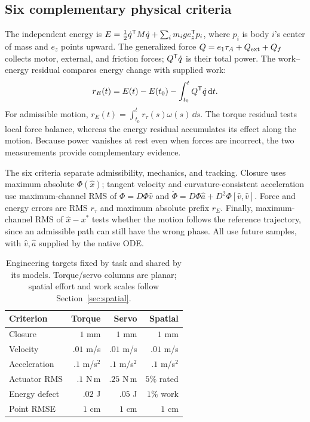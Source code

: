 \documentclass[10pt,twocolumn,letterpaper]{article}
\begin{document}
\subsection{Six complementary physical criteria}
The independent energy is $E=\tfrac12\dot q^{\mathsf T} M\dot q+\sum_i m_i g e_z^{\mathsf T} p_i$, where $p_i$ is body $i$'s center of mass and $e_z$ points upward. The generalized force $Q=e_1\tau_A+Q_{\rm ext}+Q_f$ collects motor, external, and friction forces; $Q^{\mathsf T}\dot q$ is their total power. The work--energy residual compares energy change with supplied work:
\begin{equation}
r_E(t)=E(t)-E(t_0)-\int_{t_0}^t Q^{\mathsf T}\dot q\,\mathrm{d} t.
\label{eq:energy}
\end{equation}
For admissible motion, $r_E(t)=\int_{t_0}^t r_\tau(s)\omega(s)\,\dd s$. The torque residual tests local force balance, whereas the energy residual accumulates its effect along the motion. Because power vanishes at rest even when forces are incorrect, the two measurements provide complementary evidence.

The six criteria separate admissibility, mechanics, and tracking. Closure uses maximum absolute $\Phi(\hat x)$; tangent velocity and curvature-consistent acceleration use maximum-channel RMS of $\dot\Phi=D\Phi\hat v$ and $\ddot\Phi=D\Phi\hat a+D^2\Phi[\hat v,\hat v]$. Force and energy errors are RMS $r_\tau$ and maximum absolute prefix $r_E$. Finally, maximum-channel RMS of $\hat x-x^*$ tests whether the motion follows the reference trajectory, since an admissible path can still have the wrong phase. All use future samples, with $\hat v,\hat a$ supplied by the native ODE.

\begin{table}[t]
\caption{Engineering targets fixed by task and shared by its models. Torque/servo columns are planar; spatial effort and work scales follow Section~\ref{sec:spatial}.}
\label{tab:criteria}
\centering\small
\setlength{\tabcolsep}{3pt}
\begin{tabular}{lrrr}
\toprule
Criterion & Torque & Servo & Spatial\\
\midrule
Closure & $1$ mm & $1$ mm & $1$ mm\\
Velocity & $.01$ m/s & $.01$ m/s & $.01$ m/s\\
Acceleration & $.1$ m/s$^2$ & $.1$ m/s$^2$ & $.1$ m/s$^2$\\
Actuator RMS & $.1$ N\,m & $.25$ N\,m & $5\%$ rated\\
Energy defect & $.02$ J & $.05$ J & $1\%$ work\\
Point RMSE & $1$ cm & $1$ cm & $1$ cm\\
\bottomrule
\end{tabular}
\end{table}
\end{document}

